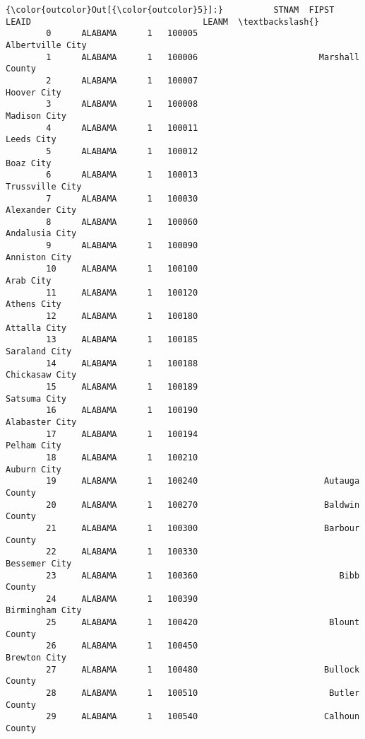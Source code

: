 \documentclass[11pt]{article}
\begin{document}
\begin{Verbatim}[commandchars=\\\{\}]
{\color{outcolor}Out[{\color{outcolor}5}]:}          STNAM  FIPST    LEAID                                  LEANM  \textbackslash{}
        0      ALABAMA      1   100005                       Albertville City   
        1      ALABAMA      1   100006                        Marshall County   
        2      ALABAMA      1   100007                            Hoover City   
        3      ALABAMA      1   100008                           Madison City   
        4      ALABAMA      1   100011                             Leeds City   
        5      ALABAMA      1   100012                              Boaz City   
        6      ALABAMA      1   100013                        Trussville City   
        7      ALABAMA      1   100030                         Alexander City   
        8      ALABAMA      1   100060                         Andalusia City   
        9      ALABAMA      1   100090                          Anniston City   
        10     ALABAMA      1   100100                              Arab City   
        11     ALABAMA      1   100120                            Athens City   
        12     ALABAMA      1   100180                           Attalla City   
        13     ALABAMA      1   100185                          Saraland City   
        14     ALABAMA      1   100188                         Chickasaw City   
        15     ALABAMA      1   100189                           Satsuma City   
        16     ALABAMA      1   100190                         Alabaster City   
        17     ALABAMA      1   100194                            Pelham City   
        18     ALABAMA      1   100210                            Auburn City   
        19     ALABAMA      1   100240                         Autauga County   
        20     ALABAMA      1   100270                         Baldwin County   
        21     ALABAMA      1   100300                         Barbour County   
        22     ALABAMA      1   100330                          Bessemer City   
        23     ALABAMA      1   100360                            Bibb County   
        24     ALABAMA      1   100390                        Birmingham City   
        25     ALABAMA      1   100420                          Blount County   
        26     ALABAMA      1   100450                           Brewton City   
        27     ALABAMA      1   100480                         Bullock County   
        28     ALABAMA      1   100510                          Butler County   
        29     ALABAMA      1   100540                         Calhoun County   

\end{Verbatim}
\end{document}
